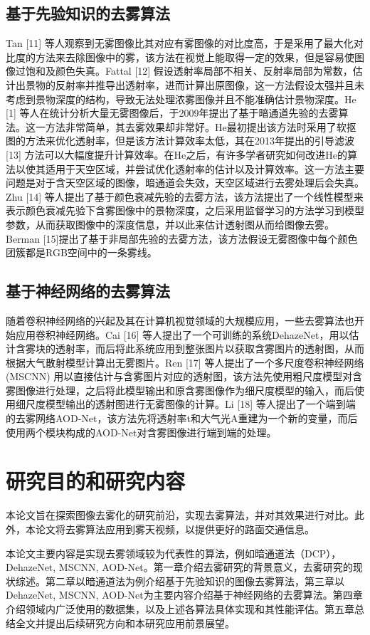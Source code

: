 \documentclass[a4paper, 12pt]{report}
\begin{document}
\subsection{基于先验知识的去雾算法\quad}
Tan [11] 等人观察到无雾图像比其对应有雾图像的对比度高，于是采用了最大化对比度的方法来去除图像中的雾，该方法在视觉上能取得一定的效果，但是容易使图像过饱和及颜色失真。Fattal [12] 假设透射率局部不相关、反射率局部为常数，估计出景物的反射率并推导出透射率，进而计算出原图像，这一方法假设太强并且未考虑到景物深度的结构，导致无法处理浓雾图像并且不能准确估计景物深度。He [1] 等人在统计分析大量无雾图像后，于2009年提出了基于暗通道先验的去雾算法。这一方法非常简单，其去雾效果却非常好。He最初提出该方法时采用了软抠图的方法来优化透射率，但是该方法计算效率太低，其在2013年提出的引导滤波 [13] 方法可以大幅度提升计算效率。在He之后，有许多学者研究如何改进He的算法以使其适用于天空区域，并尝试优化透射率的估计以及计算效率。这一方法主要问题是对于含天空区域的图像，暗通道会失效，天空区域进行去雾处理后会失真。Zhu [14] 等人提出了基于颜色衰减先验的去雾方法，该方法提出了一个线性模型来表示颜色衰减先验下含雾图像中的景物深度，之后采用监督学习的方法学习到模型参数，从而获取图像中的深度信息，并以此来估计透射图从而给图像去雾。Berman [15]提出了基于非局部先验的去雾方法，该方法假设无雾图像中每个颜色团簇都是RGB空间中的一条雾线。

\subsection{基于神经网络的去雾算法\quad}
随着卷积神经网络的兴起及其在计算机视觉领域的大规模应用，一些去雾算法也开始应用卷积神经网络。Cai [16] 等人提出了一个可训练的系统DehazeNet，用以估计含雾块的透射率，而后将此系统应用到整张图片以获取含雾图片的透射图，从而根据大气散射模型计算出无雾图片。Ren [17] 等人提出了一个多尺度卷积神经网络 (MSCNN) 用以直接估计与含雾图片对应的透射图，该方法先使用粗尺度模型对含雾图像进行处理，之后将此模型输出和原含雾图像作为细尺度模型的输入，而后使用细尺度模型输出的透射图进行无雾图像的计算。Li [18] 等人提出了一个端到端的去雾网络AOD-Net，该方法先将透射率t和大气光A重建为一个新的变量，而后使用两个模块构成的AOD-Net对含雾图像进行端到端的处理。

\section{研究目的和研究内容\quad}
本论文旨在探索图像去雾化的研究前沿，实现去雾算法，并对其效果进行对比。此外，本论文将去雾算法应用到雾天视频，以提供更好的路面交通信息。

本论文主要内容是实现去雾领域较为代表性的算法，例如暗通道法（DCP），DehazeNet, MSCNN, AOD-Net。第一章介绍去雾研究的背景意义，去雾研究的现状综述。第二章以暗通道法为例介绍基于先验知识的图像去雾算法，第三章以DehazeNet, MSCNN, AOD-Net为主要内容介绍基于神经网络的去雾算法。第四章介绍领域内广泛使用的数据集，以及上述各算法具体实现和其性能评估。第五章总结全文并提出后续研究方向和本研究应用前景展望。
\end{document}
